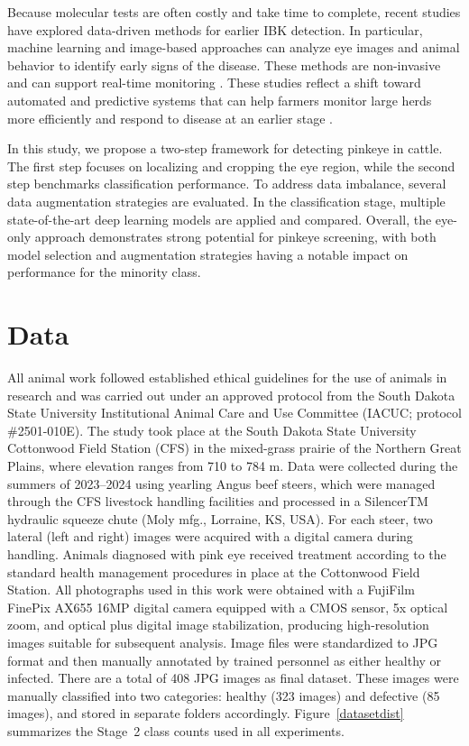 \documentclass[preprint,12pt,authoryear]{elsarticle}
\begin{document}
Because molecular tests are often costly and take time to complete, recent studies have explored data-driven methods for earlier IBK detection. In particular, machine learning and image-based approaches can analyze eye images and animal behavior to identify early signs of the disease. These methods are non-invasive and can support real-time monitoring \citep{gupta2023, mahmud2021}. These studies reflect a shift toward automated and predictive systems that can help farmers monitor large herds more efficiently and respond to disease at an earlier stage \citep{mahmud2021, mia2025}.

In this study, we propose a two-step framework for detecting pinkeye in cattle. The first step focuses on localizing and cropping the eye region, while the second step benchmarks classification performance. To address data imbalance, several data augmentation strategies are evaluated. In the classification stage, multiple state-of-the-art deep learning models are applied and compared. Overall, the eye-only approach demonstrates strong potential for pinkeye screening, with both model selection and augmentation strategies having a notable impact on performance for the minority class.

\section{Data}
\label{dataset}

All animal work followed established ethical guidelines for the use of animals in research and was carried out under an approved protocol from the South Dakota State University Institutional Animal Care and Use Committee (IACUC; protocol \#2501-010E). The study took place at the South Dakota State University Cottonwood Field Station (CFS) in the mixed-grass prairie of the Northern Great Plains, where elevation ranges from 710 to 784 m. Data were collected during the summers of 2023–2024 using yearling Angus beef steers, which were managed through the CFS livestock handling facilities and processed in a SilencerTM hydraulic squeeze chute (Moly mfg., Lorraine, KS, USA). For each steer, two lateral (left and right) images were acquired with a digital camera during handling. Animals diagnosed with pink eye received treatment according to the standard health management procedures in place at the Cottonwood Field Station. All photographs used in this work were obtained with a FujiFilm FinePix AX655 16MP digital camera equipped with a CMOS sensor, 5x optical zoom, and optical plus digital image stabilization, producing high-resolution images suitable for subsequent analysis. Image files were standardized to JPG format and then manually annotated by trained personnel as either healthy or infected. There are a total of 408 JPG images as final dataset. These images were manually classified into two categories: healthy (323 images) and defective (85 images), and stored in separate folders accordingly. Figure~\ref{datasetdist} summarizes the Stage~2 class counts used in all experiments.
\end{document}
